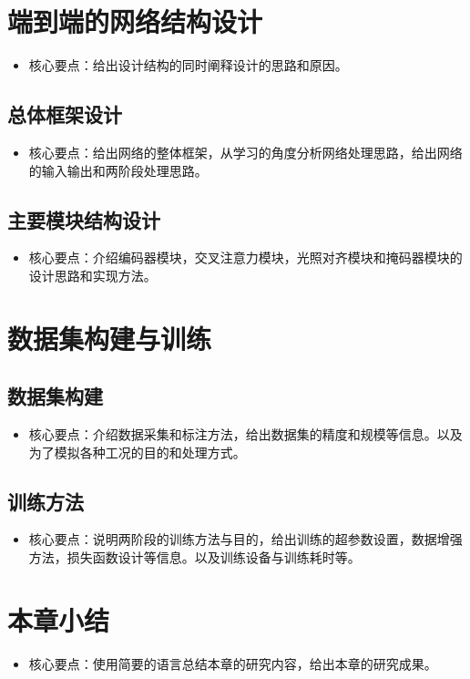 \documentclass{Diploma}
\begin{document}
\section{端到端的网络结构设计}
\begin{itemize}
  \item 核心要点：给出设计结构的同时阐释设计的思路和原因。
\end{itemize}
\subsection{总体框架设计}
\begin{itemize}
  \item 核心要点：给出网络的整体框架，从学习的角度分析网络处理思路，给出网络的输入输出和两阶段处理思路。
\end{itemize}
\subsection{主要模块结构设计}
\begin{itemize}
  \item 核心要点：介绍编码器模块，交叉注意力模块，光照对齐模块和掩码器模块的设计思路和实现方法。
\end{itemize}
\section{数据集构建与训练}
\subsection{数据集构建}
\begin{itemize}
  \item 核心要点：介绍数据采集和标注方法，给出数据集的精度和规模等信息。以及为了模拟各种工况的目的和处理方式。
\end{itemize}
\subsection{训练方法}
\begin{itemize}
  \item 核心要点：说明两阶段的训练方法与目的，给出训练的超参数设置，数据增强方法，损失函数设计等信息。以及训练设备与训练耗时等。
\end{itemize}
\section{本章小结}
\begin{itemize}
  \item 核心要点：使用简要的语言总结本章的研究内容，给出本章的研究成果。
\end{itemize}
\end{document}

